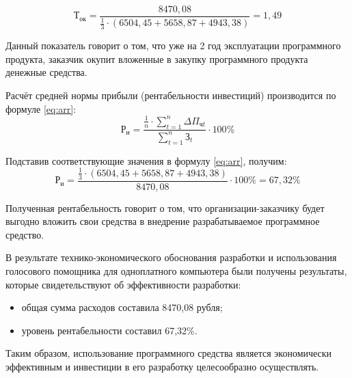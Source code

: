 \[
\text{Т}_{\text{ок}} = \frac{8470{,}08}{\frac{1}{3} \cdot (6504{,}45 + 5658{,}87 + 4943{,}38)} = 1{,}49 
\]

Данный показатель говорит о том, что уже на 2 год эксплуатации программного продукта, заказчик окупит вложенные в закупку программного продукта денежные средства.

Расчёт средней нормы прибыли (рентабельности инвестиций) производится по формуле \ref{eq:arr}: 
\begin{equation}
	\label{eq:arr}
	\mathrm{Р_{и}} = \frac{\frac{1}{n} \cdot \sum_{t=1}^n \Delta \Pi_{\text{ч}t}}{\sum_{t=1}^n \text{З}_t} \cdot 100\%
\end{equation}

Подставив соответствующие значения в формулу \ref{eq:arr}, получим:
\[
\mathrm{Р_{и}}  = \frac{\frac{1}{3} \cdot \left(6504{,}45 + 5658{,}87 + 4943{,}38\right)}{8470{,}08} \cdot 100\% = 67{,}32\%
\]

Полученная рентабельность говорит о том, что организации-заказчику будет выгодно вложить свои средства в внедрение разрабатываемое программное средство.

В результате технико-экономического обоснования разработки и использования голосового помощника для одноплатного компьютера были получены результаты, которые свидетельствуют об эффективности разработки:

\begin{itemize}
	\item общая сумма расходов составила 8470,08 рубля;
	\item уровень рентабельности составил 67,32\%.
\end{itemize}

Таким образом, использование программного средства является экономически эффективным и инвестиции в его разработку целесообразно осуществлять.


\newpage

